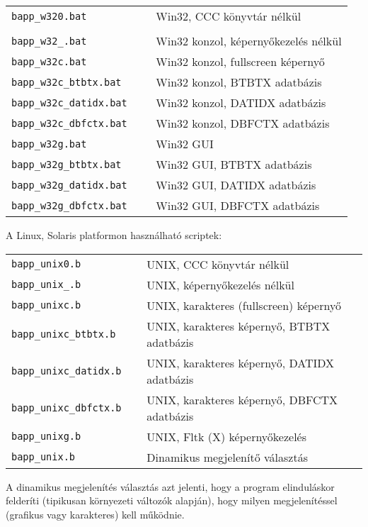 \begin{tabular}{ll} 
\verb'bapp_w320.bat          ' & Win32, CCC könyvtár nélkül             \\                           \\ 
\verb'bapp_w32_.bat          ' & Win32 konzol, képernyőkezelés nélkül   \\ 
\verb'bapp_w32c.bat          ' & Win32 konzol, fullscreen képernyő      \\ 
\verb'bapp_w32c_btbtx.bat    ' & Win32 konzol, BTBTX adatbázis          \\ 
\verb'bapp_w32c_datidx.bat   ' & Win32 konzol, DATIDX adatbázis         \\ 
\verb'bapp_w32c_dbfctx.bat   ' & Win32 konzol, DBFCTX adatbázis         \\ 
\verb'bapp_w32g.bat          ' & Win32 GUI                              \\ 
\verb'bapp_w32g_btbtx.bat    ' & Win32 GUI, BTBTX adatbázis             \\ 
\verb'bapp_w32g_datidx.bat   ' & Win32 GUI, DATIDX adatbázis            \\ 
\verb'bapp_w32g_dbfctx.bat   ' & Win32 GUI, DBFCTX adatbázis            \\ 
\end{tabular}
 
A Linux, Solaris platformon használható scriptek:

\begin{tabular}{ll} 
\verb'bapp_unix0.b          ' & UNIX, CCC könyvtár nélkül              \\ 
\verb'bapp_unix_.b          ' & UNIX, képernyőkezelés nélkül           \\  
\verb'bapp_unixc.b          ' & UNIX, karakteres (fullscreen) képernyő \\   
\verb'bapp_unixc_btbtx.b    ' & UNIX, karakteres képernyő, BTBTX adatbázis  \\ 
\verb'bapp_unixc_datidx.b   ' & UNIX, karakteres képernyő, DATIDX adatbázis \\ 
\verb'bapp_unixc_dbfctx.b   ' & UNIX, karakteres képernyő, DBFCTX adatbázis \\ 
\verb'bapp_unixg.b          ' & UNIX, Fltk (X) képernyőkezelés         \\
\verb'bapp_unix.b           ' & Dinamikus megjelenítő választás        \\ 
\end{tabular}

A dinamikus megjelenítés választás azt jelenti, hogy a program
elinduláskor felderíti (tipikusan környezeti változók alapján),
hogy milyen megjelenítéssel (grafikus vagy karakteres) kell működnie.

